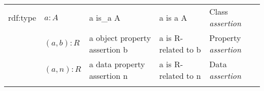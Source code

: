 \documentclass[a4paper,]{report}
\begin{document}
\begin{longtable}[]{@{}lllll@{}}
\begin{minipage}[t]{0.18\columnwidth}\raggedright
rdf:type\strut
\end{minipage} & \begin{minipage}[t]{0.16\columnwidth}\raggedright
\(a:A\)\strut
\end{minipage} & \begin{minipage}[t]{0.17\columnwidth}\raggedright
a is\_a A\strut
\end{minipage} & \begin{minipage}[t]{0.20\columnwidth}\raggedright
a is a A\strut
\end{minipage} & \begin{minipage}[t]{0.14\columnwidth}\raggedright
Class \emph{assertion}\strut
\end{minipage}\tabularnewline
\begin{minipage}[t]{0.18\columnwidth}\raggedright
\strut
\end{minipage} & \begin{minipage}[t]{0.16\columnwidth}\raggedright
\((a,b):R\)\strut
\end{minipage} & \begin{minipage}[t]{0.17\columnwidth}\raggedright
a object property assertion b\strut
\end{minipage} & \begin{minipage}[t]{0.20\columnwidth}\raggedright
a is R-related to b\strut
\end{minipage} & \begin{minipage}[t]{0.14\columnwidth}\raggedright
Property \emph{assertion}\strut
\end{minipage}\tabularnewline
\begin{minipage}[t]{0.18\columnwidth}\raggedright
\strut
\end{minipage} & \begin{minipage}[t]{0.16\columnwidth}\raggedright
\((a,n):R\)\strut
\end{minipage} & \begin{minipage}[t]{0.17\columnwidth}\raggedright
a data property assertion n\strut
\end{minipage} & \begin{minipage}[t]{0.20\columnwidth}\raggedright
a is R-related to n\strut
\end{minipage} & \begin{minipage}[t]{0.14\columnwidth}\raggedright
Data \emph{assertion}\strut
\end{minipage}\tabularnewline
\begin{minipage}[t]{0.18\columnwidth}\raggedright

\end{minipage}
\end{longtable}
\end{document}
